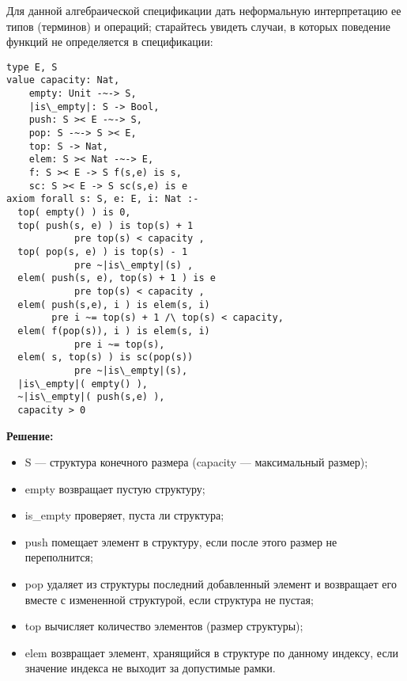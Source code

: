 

\z Для данной алгебраической спецификации дать неформальную интерпретацию ее типов (терминов) и операций; старайтесь увидеть случаи, в которых поведение функций не определяется в спецификации:
\begin{lstlisting}[escapechar={|}]
type E, S
value capacity: Nat,
    empty: Unit -~-> S,
    |is\_empty|: S -> Bool,
    push: S >< E -~-> S,
    pop: S -~-> S >< E,
    top: S -> Nat,
    elem: S >< Nat -~-> E,
    f: S >< E -> S f(s,e) is s,
    sc: S >< E -> S sc(s,e) is e
axiom forall s: S, e: E, i: Nat :-
  top( empty() ) is 0,
  top( push(s, e) ) is top(s) + 1
            pre top(s) < capacity ,
  top( pop(s, e) ) is top(s) - 1
            pre ~|is\_empty|(s) ,
  elem( push(s, e), top(s) + 1 ) is e
            pre top(s) < capacity ,
  elem( push(s,e), i ) is elem(s, i)
        pre i ~= top(s) + 1 /\ top(s) < capacity,
  elem( f(pop(s)), i ) is elem(s, i)
            pre i ~= top(s),
  elem( s, top(s) ) is sc(pop(s))
            pre ~|is\_empty|(s),
  |is\_empty|( empty() ),
  ~|is\_empty|( push(s,e) ),
  capacity > 0
\end{lstlisting}

\textbf{Решение:}
\begin{itemize}
  \item S --- структура конечного размера (capacity --- максимальный размер);
  \item empty возвращает пустую структуру;
  \item is\_empty проверяет, пуста ли структура;
  \item push помещает элемент в структуру, если после этого размер не переполнится;
  \item pop удаляет из структуры последний добавленный элемент и возвращает его вместе с измененной структурой, если структура не пустая;
  \item top вычисляет количество элементов (размер структуры);
  \item elem возвращает элемент, хранящийся в структуре по данному индексу, если значение индекса не выходит за допустимые рамки.
\end{itemize}

